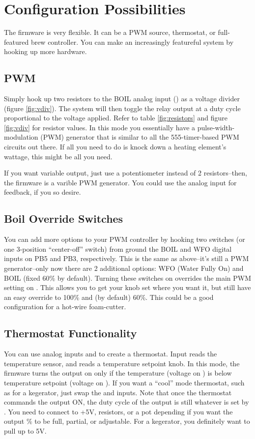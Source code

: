 \documentclass[dvips,12pt]{article}
\begin{document}
\section{Configuration Possibilities}

The firmware is very flexible. It can be a PWM source, thermostat, or full-featured brew controller. You can make an increasingly featureful system by hooking up more hardware. 

\subsection{PWM}
Simply hook up two resistors to the BOIL analog input (\duty) as a voltage divider (figure \ref{fig:vdiv}). The system
will then toggle the relay output \relay{} at a duty cycle proportional to the voltage applied. Refer to table
\ref{fig:resistors} and figure \ref{fig:vdiv} for resistor values. In this mode you essentially have a
pulse-width-modulation (PWM) generator that is similar to all the 555-timer-based PWM circuits out there. If all you need to do is knock down a heating element's wattage, this might be all you need. 

If you want variable output, just use a potentiometer instead of 2 resistors--then, the firmware is a varible PWM generator. You could use the analog input for feedback, if you so desire.

\subsection{Boil Override Switches} 
You can add more options to your PWM controller by hooking two switches (or one 3-position ``center-off'' switch) from
ground the BOIL and WFO digital inputs on PB5 and PB3, respectively. This is the same as above--it's still a PWM
generator--only now there are 2 additional options: WFO (Water Fully On) and BOIL (fixed 60\% by default).  Turning these
switches on overrides the main PWM setting on \duty. This allows you to get your knob set where you want it, but still
have an easy override to 100\% and (by default) 60\%. This could be a good configuration for a hot-wire foam-cutter. 

\subsection{Thermostat Functionality} 
You can use analog inputs \probe{} and \temp{} to create a thermostat. Input \probe{} reads the temperature sensor, and
\temp{} reads a temperature setpoint knob. In this mode, the firmware turns the output on only if the temperature
(voltage on \probe) is below temperature setpoint (voltage on \temp). If you want a ``cool'' mode thermostat, such as for
a kegerator, just swap the \temp{} and \probe{} inputs. Note that once the thermostat commands the output ON, the duty
cycle of the output is still whatever is set by \duty. You need to connect \duty{} to +5V, resistors, or a pot depending
if you want the output \% to be full, partial, or adjustable. For a kegerator, you definitely want to pull \duty{} up to
5V.
\end{document}
